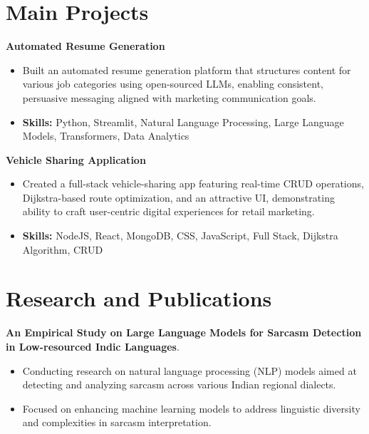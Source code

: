\documentclass[a4paper,11pt]{article}
\begin{document}
\section{\textbf{Main Projects}}

\vspace{1mm}
  \textbf{Automated Resume Generation  }
\vspace{-1.5mm} %
\begin{itemize}
  \item Built an automated resume generation platform that structures content for various job categories using open-sourced LLMs, enabling consistent, persuasive messaging aligned with marketing communication goals.
\vspace{-3mm}
  \item \textbf{Skills:} Python, Streamlit, Natural Language Processing, Large Language Models, Transformers, Data Analytics
\end{itemize}


\vspace{1mm}
   \textbf{Vehicle Sharing Application }
\vspace{-1.5mm} %
\begin{itemize}
  \item Created a full-stack vehicle-sharing app featuring real-time CRUD operations, Dijkstra-based route optimization, and an attractive UI, demonstrating ability to craft user-centric digital experiences for retail marketing.
\vspace{-3mm}
  \item \textbf{Skills:} NodeJS, React, MongoDB, CSS, JavaScript, Full Stack, Dijkstra Algorithm, CRUD
\end{itemize}



\section{\textbf{Research and Publications} \hfill }
\vspace{1mm}
  \textbf{An Empirical Study on Large Language Models for Sarcasm Detection in Low-resourced Indic Languages}.
\vspace{-1mm} %
\begin{itemize}
  \item Conducting research on natural language processing (NLP) models aimed at detecting and analyzing sarcasm across various Indian regional dialects.
\vspace{-3mm}
  \item Focused on enhancing machine learning models to address linguistic diversity and complexities in sarcasm interpretation.
\end{itemize}
\end{document}
